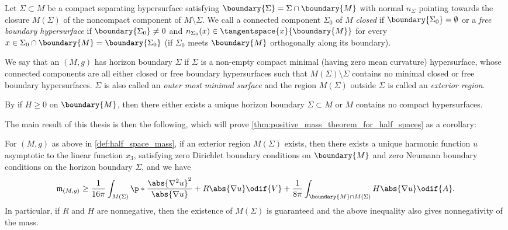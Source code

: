 \documentclass[titlepage,numbers=noenddot,headinclude,oneside,%
footinclude=true,cleardoublepage=empty,%
BCOR=5mm,paper=a4,fontsize=11pt,%
english,%
]{scrartcl}
\newcommand{\mass}[2]{\mathfrak{m}_{(#1,#2)}} %
\begin{document}
\begin{definition}
    Let \( \Sigma\subset M  \) be a compact separating hypersurface satisfying \( \boundary{\Sigma}=\Sigma\cap \boundary{M} \) with normal \( n_\Sigma \) pointing towards the closure \( M(\Sigma) \) of the noncompact component of \( M\setminus \Sigma \). We call a connected component \( \Sigma_0 \) of \( M \) \emph{closed} if \( \boundary{\Sigma_0}=\emptyset \) or a \emph{free boundary hypersurface} if \( \boundary{\Sigma_0}\neq 0 \) and \( n_{\Sigma_0}(x)\in \tangentspace{x}{\boundary{M}} \) for every \( x\in \Sigma_0\cap \boundary{M}=\boundary{\Sigma_0} \) (\ie if \( \Sigma_0 \) meets \( \boundary{M} \) orthogonally along its boundary).

    We say that an \( (M,g) \) has horizon boundary \( \Sigma \) if \( \Sigma \) is a non-empty compact minimal (\ie having zero mean curvature) hypersurface, whose connected components are all either closed or free boundary hypersurfaces such that \( M(\Sigma)\setminus \Sigma \) contains no minimal closed or free boundary hypersurfaces. \( \Sigma \) is also called an \emph{outer most minimal surface} and the region \( M(\Sigma) \) outside \( \Sigma \) is called an \emph{exterior region}.
\end{definition}
\begin{remark}\label{rem:exterior_region_existence}
    By \cite[Lemma 2.3]{koerberRiemannianPenroseInequality2020} if \( H\geq 0 \) on \( \boundary{M} \), then there either exists a unique horizon boundary \( \Sigma\subset M \) or \( M \) contains no compact hypersurfaces.
\end{remark}
The main result of this thesis is then the following, which will prove \cref{thm:positive_mass_theorem_for_half_spaces} as a corollary:
\begin{theorem}\label{thm:main_result}
    For \( (M,g) \) as above in \cref{def:half_space_mass}, if an exterior region \( M(\Sigma) \) exists, then
    there exists a unique harmonic function \( u \) asymptotic to the linear function \( x_3 \), satisfying zero Dirichlet boundary conditions on \( \boundary{M} \) and zero Neumann boundary conditions on the horizon boundary \( \Sigma \), and we have
    \begin{equation}
        \mass{M}{g}\geq \frac{1}{16\pi}\int_{M(\Sigma)}\p*{\frac{\abs{\nabla^2 u}^2}{\abs{\nabla u}}+R\abs{\nabla u}}\odif{V}+\frac{1}{8\pi}\int_{\boundary{M}\cap M(\Sigma)}H \abs{\nabla u}\odif{A}.\label{eq:main_result}
    \end{equation} 
    In particular, if \( R \) and \( H \) are nonnegative, then the existence of \( M(\Sigma) \) is guaranteed and the above inequality also gives nonnegativity of the mass.
\end{theorem} 
\end{document}
